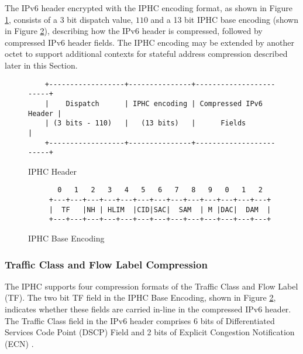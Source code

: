 \documentclass[12pt, titlepage, a4paper]{report}
\newenvironment{mylisting}
{\begin{list}{}{\setlength{\leftmargin}{1em}}\item\footnotesize}
{\end{list}}
\begin{document}
The IPv6 header encrypted with the IPHC encoding format, as shown in Figure \ref{fig:iphc.header}, consists of a 3 bit dispatch value, $110$ and a 13 bit IPHC base encoding (shown in Figure \ref{fig:iphc.format}), describing how the IPv6 header is compressed, followed by compressed IPv6 header fields. The IPHC encoding may be extended by another octet to support additional contexts for stateful address compression described later in this Section.

\begin{figure}[htp]
\begin{mylisting}
\begin{verbatim}
    +------------------+---------------+------------------------+
    |    Dispatch      | IPHC encoding | Compressed IPv6 Header |
    | (3 bits - 110)   |   (13 bits)   |      Fields            |
    +------------------+---------------+------------------------+
\end{verbatim}
\end{mylisting}
\caption{IPHC Header}\label{fig:iphc.header}
\end{figure}

\begin{figure}[htp]
\begin{mylisting}
\begin{verbatim}
       0   1   2   3   4   5   6   7   8   9   0   1   2
     +---+---+---+---+---+---+---+---+---+---+---+---+---+
     |  TF   |NH | HLIM  |CID|SAC|  SAM  | M |DAC|  DAM  |
     +---+---+---+---+---+---+---+---+---+---+---+---+---+
\end{verbatim}
\end{mylisting}
\caption{IPHC Base Encoding}\label{fig:iphc.format}
\end{figure}

\subsubsection{Traffic Class and  Flow Label Compression}
The IPHC supports four compression formats of the Traffic Class and Flow Label (TF). The two bit TF field in the IPHC Base Encoding, shown in Figure \ref{fig:iphc.format}, indicates whether these fields are carried in-line in the compressed IPv6 header. The Traffic Class field in the IPv6 header comprises 6 bits of Differentiated Services Code Point (DSCP) Field \cite{rfc2474} and 2 bits of Explicit Congestion Notification (ECN) \cite{rfc3168}.
\end{document}
